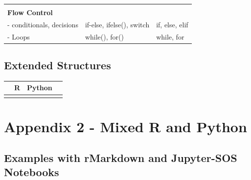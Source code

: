 \documentclass[]{book}
\theoremstyle{definition}
\theoremstyle{definition}
\theoremstyle{definition}
\theoremstyle{remark}
\begin{document}
\begin{longtable}[]{@{}lll@{}}
\begin{minipage}[t]{0.39\columnwidth}
\end{minipage}\tabularnewline
\begin{minipage}[t]{0.19\columnwidth}\raggedright\strut
\textbf{Flow Control}\strut
\end{minipage} & \begin{minipage}[t]{0.33\columnwidth}\raggedright\strut
\strut
\end{minipage} & \begin{minipage}[t]{0.39\columnwidth}\raggedright\strut
\strut
\end{minipage}\tabularnewline
\begin{minipage}[t]{0.19\columnwidth}\raggedright\strut
- conditionals, decisions\strut
\end{minipage} & \begin{minipage}[t]{0.33\columnwidth}\raggedright\strut
if-else, ifelse(), switch\strut
\end{minipage} & \begin{minipage}[t]{0.39\columnwidth}\raggedright\strut
if, else, elif\strut
\end{minipage}\tabularnewline
\begin{minipage}[t]{0.19\columnwidth}\raggedright\strut
- Loops\strut
\end{minipage} & \begin{minipage}[t]{0.33\columnwidth}\raggedright\strut
while(), for()\strut
\end{minipage} & \begin{minipage}[t]{0.39\columnwidth}\raggedright\strut
while, for\strut
\end{minipage}\tabularnewline
\bottomrule
\end{longtable}

\section{Extended Structures}\label{extended-structures}

\begin{longtable}[]{@{}llll@{}}
\toprule
& R & Python &\tabularnewline
\midrule
\endhead
& & &\tabularnewline
\bottomrule
\end{longtable}

\chapter{Appendix 2 - Mixed R and
Python}\label{appendix-2---mixed-r-and-python}

\section{Examples with rMarkdown and Jupyter-SOS
Notebooks}\label{examples-with-rmarkdown-and-jupyter-sos-notebooks}
\end{document}
